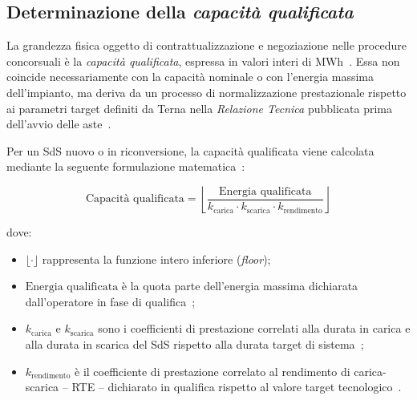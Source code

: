 \subsection{Determinazione della \textit{capacità qualificata}}
La grandezza fisica oggetto di contrattualizzazione e negoziazione nelle procedure concorsuali è la \textit{capacità qualificata}, espressa in valori interi di MWh~\cite{terna_disciplina}. Essa non coincide necessariamente con la capacità nominale o con l'energia massima dell'impianto, ma deriva da un processo di normalizzazione prestazionale rispetto ai parametri target definiti da Terna nella \textit{Relazione Tecnica} pubblicata prima dell'avvio delle aste~\cite{arera247, terna_relazione}.

Per un \ac{SdS} nuovo o in riconversione, la capacità qualificata viene calcolata mediante la seguente formulazione matematica~\cite{terna_disciplina}:

\begin{equation}
\text{Capacità qualificata} = \left\lfloor \frac{\text{Energia qualificata}}{k_{\text{carica}} \cdot k_{\text{scarica}} \cdot k_{\text{rendimento}}} \right\rfloor
\end{equation}

dove:
\begin{itemize}
    \item $\lfloor \cdot \rfloor$ rappresenta la funzione intero inferiore (\textit{floor});
    \item $\text{Energia qualificata}$ è la quota parte dell'energia massima dichiarata dall'operatore in fase di qualifica~\cite{terna_disciplina};
    \item $k_{\text{carica}}$ e $k_{\text{scarica}}$ sono i coefficienti di prestazione correlati alla durata in carica e alla durata in scarica del \ac{SdS} rispetto alla durata target di sistema~\cite{arera247, terna_relazione};
    \item $k_{\text{rendimento}}$ è il coefficiente di prestazione correlato al rendimento di carica-scarica -- \ac{RTE} -- dichiarato in qualifica rispetto al valore target tecnologico~\cite{arera247, terna_relazione}.
\end{itemize}

